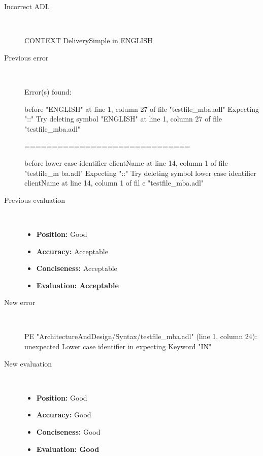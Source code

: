 \hrulefill

\begin{description}
  \item[Incorrect ADL]~\\
\begin{adl}
CONTEXT DeliverySimple in ENGLISH\end{adl}
  \item[Previous error]~\\
\begin{haskell}
Error(s) found:

before "ENGLISH" at line 1, column 27 of file "testfile_mba.adl"
Expecting "::"
Try deleting symbol "ENGLISH" at line 1, column 27 of file "testfile_mba.adl"

==============================

before lower case identifier clientName at line 14, column 1 of file "testfile_m
ba.adl"
Expecting "::"
Try deleting symbol lower case identifier clientName at line 14, column 1 of fil
e "testfile_mba.adl"\end{haskell}
  \item[Previous evaluation]~\\
    \begin{itemize}
    \item \textbf{Position:} Good
    \item \textbf{Accuracy:} Acceptable
    \item \textbf{Conciseness:} Acceptable
    \item \textbf{Evaluation: Acceptable}
    \end{itemize}
  \item[New error]~\\
\begin{haskell}
PE "ArchitectureAndDesign/Syntax/testfile_mba.adl" (line 1, column 24):
unexpected Lower case identifier in
expecting Keyword "IN"\end{haskell}
  \item[New evaluation]~\\
    \begin{itemize}
    \item \textbf{Position:} Good
    \item \textbf{Accuracy:} Good
    \item \textbf{Conciseness:} Good
    \item \textbf{Evaluation: Good}
    \end{itemize}
  \end{description}

